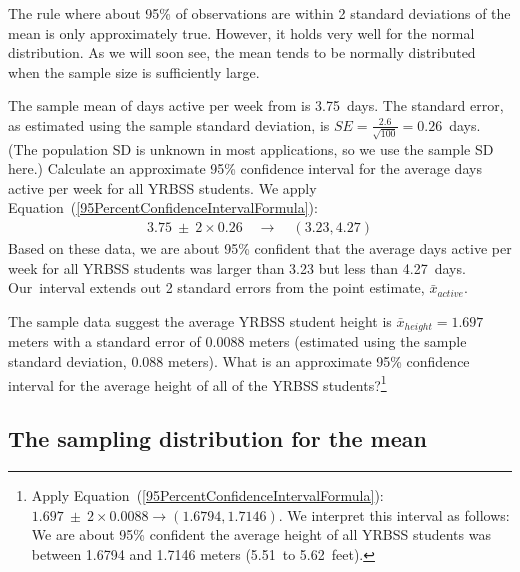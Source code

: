 The rule where about 95\% of observations are within 2 standard deviations of the mean is only approximately true. However, it holds very well for the normal distribution. As we will soon see, the mean tends to be normally distributed when the sample size is sufficiently large. 

\begin{example}{The sample mean of days active per week from  is 3.75~days. The standard error, as estimated using the sample standard deviation, is $SE=\frac{2.6}{\sqrt{100}} = 0.26$~days. (The population SD is unknown in most applications, so we use the sample SD here.) Calculate an approximate 95\% confidence interval for the average days active per week for all YRBSS students.}
We apply Equation~(\ref{95PercentConfidenceIntervalFormula}):
\begin{eqnarray*}
3.75\ \pm\ 2 \times  0.26 \quad \rightarrow \quad (3.23, 4.27)
\end{eqnarray*}
Based on these data, we are about 95\% confident that the average days active per week for all YRBSS students was larger than 3.23 but less than 4.27~days. Our~interval extends out 2 standard errors from the point estimate, $\bar{x}_{active}$.
\end{example}

\begin{exercise} \label{95CIExerciseForAgeOfYrbssSamp1}
The sample data suggest the average YRBSS student height is $\bar{x}_{height} = 1.697$ meters with a standard error of 0.0088 meters (estimated using the sample standard deviation, 0.088 meters). What is an approximate 95\% confidence interval for the average height of all of the YRBSS students?\footnote{Apply Equation~(\ref{95PercentConfidenceIntervalFormula}): $1.697 \ \pm \ 2\times 0.0088 \rightarrow (1.6794, 1.7146)$. We interpret this interval as follows: We are about 95\% confident the average height of all YRBSS students was between 1.6794 and 1.7146 meters (5.51~to 5.62~feet).}
\end{exercise}

\subsection{The sampling distribution for the mean}

